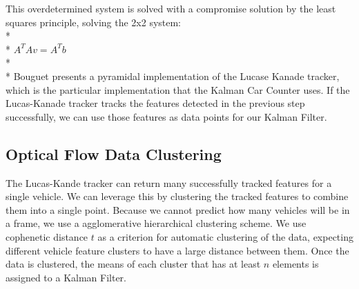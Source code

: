 \documentclass{article} %
\begin{document}
This overdetermined system is solved with a compromise solution by the least squares principle, solving the 2x2 system:\\*\\*
$A^T A v=A^T b$\\*\\*
Bouguet presents a pyramidal implementation of the Lucase Kanade tracker\cite{bouguet2001pyramidal}, which is the particular implementation that the Kalman Car Counter uses. If the Lucas-Kanade tracker tracks the features detected in the previous step successfully, we can use those features as data points for our Kalman Filter.

\subsection{Optical Flow Data Clustering}
The Lucas-Kande tracker can return many successfully tracked features for a single vehicle. We can leverage this by clustering the tracked features to combine them into a single point. Because we cannot predict how many vehicles will be in a frame, we use a agglomerative hierarchical clustering scheme. We use cophenetic distance $t$ as a criterion for automatic clustering of the data, expecting different vehicle feature clusters to have a large distance between them. Once the data is clustered, the means of each cluster that has at least $n$ elements is assigned to a Kalman Filter.
\end{document}
